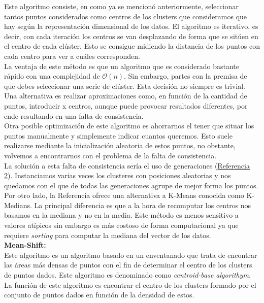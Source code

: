 \documentclass[conference,a4paper]{IEEEtran}
\begin{document}
Este algoritmo consiste, en como ya se mencionó anteriormente, seleccionar tantos puntos considerados como centros de los clusters que consideramos que hay según la representación dimensional de los datos. El algoritmo es iterativo, es decir, con cada iteración los centros se van desplazando de forma que se sitúen en el centro de cada clúster. Esto se consigue midiendo la distancia de los puntos con cada centro para ver a cuáles corresponden.\\

La ventaja de este método es que un algoritmo que es considerado bastante rápido con una complejidad de $\mathcal{O}(n)$. Sin embargo, partes con la premisa de que debes seleccionar una serie de clúster. Esta decisión no siempre es trivial. Una alternativa es realizar aproximaciones como, en función de la cantidad de puntos, introducir x centros, aunque puede provocar resultados diferentes, por ende resultando en una falta de consistencia.\\

Otra posible optimización de este algoritmo es ahorrarnos el tener que situar los puntos manualmente y simplemente indicar cuantos queremos. Esto suele realizarse mediante la inicialización aleatoria de estos puntos, no obstante, volvemos a encontrarnos con el problema de la falta de consistencia.\\

La solución a esta falta de consistencia sería el uso de generaciones (\hyperref[bib:clustering]{Referencia 2}). Instanciamos varias veces los clusteres con posiciones aleatorias y nos quedamos con el que de todas las generaciones agrupe de mejor forma los puntos.\\

Por otro lado, la Referencia ofrece una alternativa a K-Means conocida como K-Medians. La principal diferencia es que a la hora de recomputar los centros nos basamos en la mediana y no en la media. Este método es menos sensitivo a valores atípicos sin embargo es más costoso de forma computacional ya que requiere \textit{sorting} para computar la mediana del vector de los datos.\\

\textbf{Mean-Shift:}\\

Este algoritmo es un algoritmo basado en un enventanado que trata de encontrar las áreas más densas de puntos con el fin de determinar el centro de los clusters de puntos dados. Este algoritmo es denominado como \textit{centroid-base algorithym}. La función de este algoritmo es encontrar el centro de los clusters formado por el conjunto de puntos dados en función de la densidad de estos.\\
\end{document}

